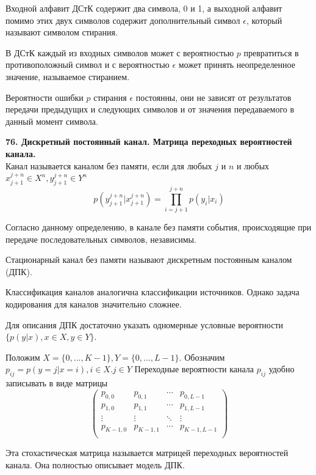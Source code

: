 \documentclass[14pt]{article}
\begin{document}
Входной алфавит ДСтК содержит два символа, 0 и 1, а выходной алфавит помимо этих двух символов содержит дополнительный символ \(\epsilon\), который называют символом стирания.

В ДСтК каждый из входных символов может с вероятностью \(p\) превратиться в противоположный символ и с вероятностью \(\epsilon\) может принять неопределенное значение, называемое стиранием.

Вероятности ошибки \(p\) стирания \(\epsilon\) постоянны, они не зависят от результатов передачи предыдущих и следующих символов и от
значения передаваемого в данный момент символа.

\bigskip
\textbf{76. Дискретный постоянный канал. Матрица переходных вероятностей канала.} \\

Канал называется каналом без памяти, если для любых \(j\) и \(n\) и любых \(x_{j+1}^{j+n} \in X^n, y_{j+1}^{j+n} \in Y^n\)
\begin{displaymath}
    p(y_{j+1}^{j+n}|x_{j+1}^{j+n}) = \prod_{i=j+1}^{j+n} p(y_i|x_i)
\end{displaymath}

Согласно данному определению, в канале без памяти события, происходящие при передаче последовательных символов, независимы.

Стационарный канал без памяти называют дискретным постоянным каналом (ДПК).

Классификация каналов аналогична классификации источников. Однако задача кодирования для каналов значительно сложнее.

Для описания ДПК достаточно указать одномерные условные вероятности \(\{p(y|x), x \in X, y \in Y\}\).

Положим \(X = \{0,...,K - 1\}, Y = \{0,...,L - 1\}\). Обозначим \(p_{ij} = p(y = j|x = i), i \in X. j \in Y\) Переходные вероятности канала \(p_{ij}\) удобно записывать в виде матрицы
\begin{displaymath}
 \begin{pmatrix}
     p_{0,0} & p_{0,1} & \cdots & p_{0,L-1} \\
     p_{1,0} & p_{1,1} & \cdots & p_{1,L-1} \\
  \vdots  & \vdots  & \ddots & \vdots  \\
  p_{K-1,0} & p_{K-1,1} & \cdots & p_{K-1,L-1} \\
 \end{pmatrix}
\end{displaymath}

Эта стохастическая матрица называется матрицей переходных вероятностей канала. Она полностью описывает модель ДПК.
\end{document}
